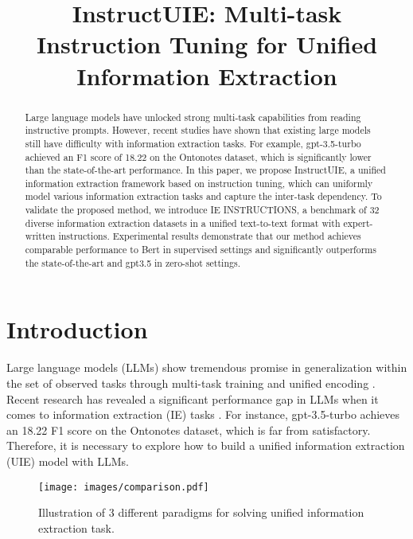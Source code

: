 \title{InstructUIE: Multi-task Instruction Tuning for Unified Information Extraction}



\maketitle
\begin{abstract}

Large language models have unlocked strong multi-task capabilities from reading instructive prompts.
However, recent studies have shown that existing large models still have difficulty with information extraction tasks. 
For example, gpt-3.5-turbo achieved an F1 score of 18.22 on the Ontonotes dataset, which is significantly lower than the state-of-the-art performance.
In this paper, we propose InstructUIE, a unified information extraction framework based on instruction tuning, which can uniformly model various information extraction tasks and capture the inter-task dependency.
To validate the proposed method, we introduce IE INSTRUCTIONS, a benchmark of 32 diverse information extraction datasets in a unified text-to-text format with expert-written instructions.
Experimental results demonstrate that our method achieves comparable performance to Bert in supervised settings and significantly outperforms the state-of-the-art and gpt3.5 in zero-shot settings.

\end{abstract}

\section{Introduction}

Large language models (LLMs) \cite{Brown2020LanguageMA,InstructGPT,GPT4} show tremendous promise in generalization within the set of observed tasks through multi-task training and unified encoding \cite{mishra-etal-2022-cross,wang-etal-2022-super,Longpre2023TheFC}. 
Recent research has revealed a significant performance gap in LLMs when it comes to information extraction (IE) tasks \cite{ye2023comprehensive,chen2023robust}. 
For instance, gpt-3.5-turbo achieves an 18.22 F1 score on the Ontonotes dataset, which is far from satisfactory. 
Therefore, it is necessary to explore how to build a unified information extraction (UIE) model with LLMs.

\begin{figure}[t]
\small
\centering
  \texttt{[image: images/comparison.pdf]}
  \caption{Illustration of 3 different paradigms for solving unified information extraction task.}
 \label{comparison}
\end{figure}

